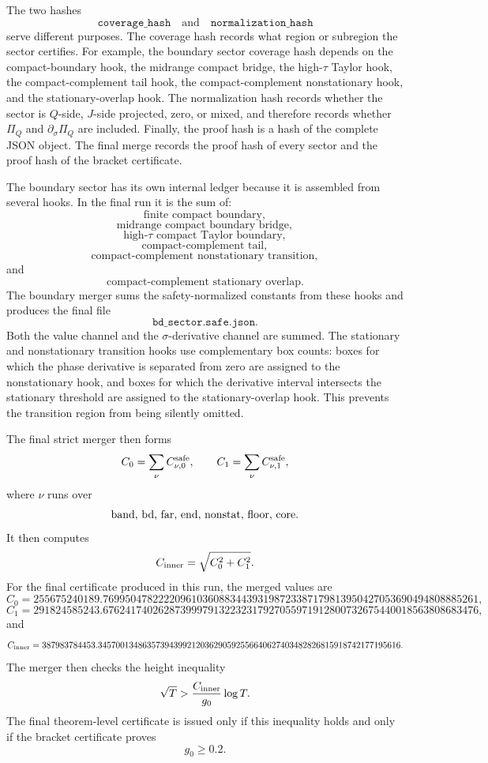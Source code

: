 \documentclass[11pt]{article}
\newcommand{\sig}{\sigma}
\newcommand{\tauh}{\tau}
\newcommand{\PiQ}{\Pi_Q}
\newcommand{\Czero}{C_0}
\newcommand{\Cone}{C_1}
\newcommand{\Cinner}{C_{\rm inner}}
\newcommand{\gzero}{g_0}
\newcommand{\JSON}[1]{\texttt{#1}}
\newcommand{\code}[1]{\texttt{#1}}
\begin{document}
The two hashes
\[
        \JSON{coverage\_hash}
        \quad\text{and}\quad
        \JSON{normalization\_hash}
\]
serve different purposes.  The coverage hash records what region or subregion
the sector certifies.  For example, the boundary sector coverage hash depends
on the compact-boundary hook, the midrange compact bridge, the high-\(\tauh\)
Taylor hook, the compact-complement tail hook, the compact-complement
nonstationary hook, and the stationary-overlap hook.  The normalization hash
records whether the sector is \(Q\)-side, \(J\)-side projected, zero, or mixed,
and therefore records whether \(\PiQ\) and \(\partial_\sig\PiQ\) are included.
Finally, the proof hash is a hash of the complete JSON object.  The final merge
records the proof hash of every sector and the proof hash of the bracket
certificate.

The boundary sector has its own internal ledger because it is assembled from
several hooks.  In the final run it is the sum of:
\[
        \text{finite compact boundary},
\]
\[
        \text{midrange compact boundary bridge},
\]
\[
        \text{high-\(\tauh\) compact Taylor boundary},
\]
\[
        \text{compact-complement tail},
\]
\[
        \text{compact-complement nonstationary transition},
\]
and
\[
        \text{compact-complement stationary overlap}.
\]
The boundary merger sums the safety-normalized constants from these hooks and
produces the final file
\[
        \code{bd\_sector.safe.json}.
\]
Both the value channel and the \(\sig\)-derivative channel are summed.  The
stationary and nonstationary transition hooks use complementary box counts:
boxes for which the phase derivative is separated from zero are assigned to the
nonstationary hook, and boxes for which the derivative interval intersects the
stationary threshold are assigned to the stationary-overlap hook.  This prevents
the transition region from being silently omitted.

The final strict merger then forms
\[
        \Czero
        =
        \sum_\nu C_{\nu,0}^{\rm safe},
        \qquad
        \Cone
        =
        \sum_\nu C_{\nu,1}^{\rm safe},
\]
where \(\nu\) runs over
\[
        {\rm band},\,
        {\rm bd},\,
        {\rm far},\,
        {\rm end},\,
        {\rm nonstat},\,
        {\rm floor},\,
        {\rm core}.
\]
It then computes
\[
        \Cinner
        =
        \sqrt{\Czero^2+\Cone^2}.
\]
For the final certificate produced in this run, the merged values are
\[
        \Czero
        =
        255675240189.76995047822220961036088344393198723387179813950427053690494808885261,
\]
\[
        \Cone
        =
        291824585243.67624174026287399979132232317927055971912800732675440018563808683476,
\]
and
\[
        \Cinner
        =
        387983784453.34570013486357394399212036290592556640627403482826815918742177195616.
\]
The merger then checks the height inequality
\[
        \sqrt T>
        \frac{\Cinner}{\gzero}\log T.
\]
The final theorem-level certificate is issued only if this inequality holds and
only if the bracket certificate proves
\[
        \gzero\ge0.2.
\]
\end{document}
